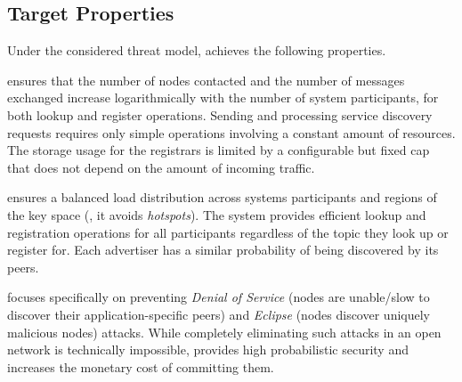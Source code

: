 
\subsection{Target Properties}

Under the considered threat model, \sysname achieves the following properties.

\sysname ensures that the number of nodes contacted and the number of messages exchanged increase logarithmically with the number of system participants, for both lookup and register operations. 
Sending and processing service discovery requests requires only simple operations involving a constant amount of resources.
The storage usage for the registrars is limited by a configurable but fixed cap that does not depend on the amount of incoming traffic. 

\sysname ensures a balanced load distribution across systems participants and regions of the key space (\ie, it avoids \emph{hotspots}).
The system provides efficient lookup and registration operations for all participants regardless of the topic they look up or register for.
Each advertiser has a similar probability of being discovered by its peers. 

\sysname focuses specifically on preventing \emph{Denial of Service} (nodes are unable/slow to discover their application-specific peers) and \emph{Eclipse} (nodes discover uniquely malicious nodes) attacks.
While completely eliminating such attacks in an open network is technically impossible, \sysname provides high probabilistic security 
and increases the monetary cost of committing them. 
